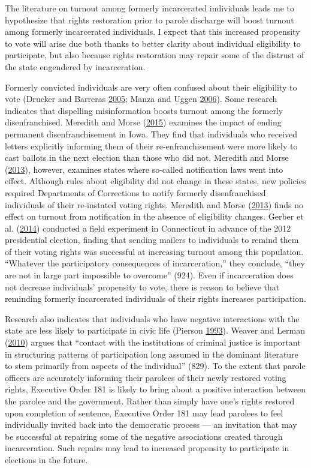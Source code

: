 \documentclass[
  12pt,
]{article}
\begin{document}
The literature on turnout among formerly incarcerated individuals leads me to hypothesize that rights restoration prior to parole discharge will boost turnout among formerly incarcerated individuals. I expect that this increased propensity to vote will arise due both thanks to better clarity about individual eligibility to participate, but also because rights restoration may repair some of the distrust of the state engendered by incarceration.

Formerly convicted individuals are very often confused about their eligibility to vote (Drucker and Barreras \protect\hyperlink{ref-Drucker2005}{2005}; Manza and Uggen \protect\hyperlink{ref-locked_out}{2006}). Some research indicates that dispelling misinformation boosts turnout among the formerly disenfranchised. Meredith and Morse (\protect\hyperlink{ref-Meredith2015}{2015}) examines the impact of ending permanent disenfranchisement in Iowa. They find that individuals who received letters explicitly informing them of their re-enfranchisement were more likely to cast ballots in the next election than those who did not. Meredith and Morse (\protect\hyperlink{ref-Meredith2013}{2013}), however, examines states where so-called notification laws went into effect. Although rules about eligibility did not change in these states, new policies required Departments of Corrections to notify formerly disenfranchised individuals of their re-instated voting rights. Meredith and Morse (\protect\hyperlink{ref-Meredith2013}{2013}) finds no effect on turnout from notification in the absence of eligibility changes. Gerber et al. (\protect\hyperlink{ref-Gerber2014}{2014}) conducted a field experiment in Connecticut in advance of the 2012 presidential election, finding that sending mailers to individuals to remind them of their voting rights was successful at increasing turnout among this population. ``Whatever the participatory consequences of incarceration,'' they conclude, ``they are not in large part impossible to overcome'' (924). Even if incarceration does not decrease individuals' propensity to vote, there is reason to believe that reminding formerly incarcerated individuals of their rights increases participation.

Research also indicates that individuals who have negative interactions with the state are less likely to participate in civic life (Pierson \protect\hyperlink{ref-Pierson1993}{1993}). Weaver and Lerman (\protect\hyperlink{ref-Weaver2010}{2010}) argues that ``contact with the institutions of criminal justice is important in structuring patterns of participation long assumed in the dominant literature to stem primarily from aspects of the individual'' (829). To the extent that parole officers are accurately informing their parolees of their newly restored voting rights, Executive Order 181 is likely to bring about a positive interaction between the parolee and the government. Rather than simply have one's rights restored upon completion of sentence, Executive Order 181 may lead parolees to feel individually invited back into the democratic process --- an invitation that may be successful at repairing some of the negative associations created through incarceration. Such repairs may lead to increased propensity to participate in elections in the future.
\end{document}
